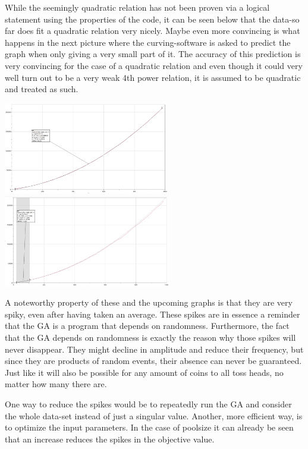 \par
While the seemingly quadratic relation has not been proven via a logical statement using the properties of the code, it can be seen below that the data-so far does fit a quadratic relation very nicely. Maybe even more convincing is what happens in the next picture where the curving-software is asked to predict the graph when only giving a very small part of it. The accuracy of this prediction is very convincing for the case of a quadratic relation and even though it could very well turn out to be a very weak 4th power relation, it is assumed to be quadratic and treated as such.
\vspace{5mm}
\begin{centering}
	\includegraphics[height=4cm]{LPPC}\includegraphics[height=4cm]{LPPP}
\end{centering}
\par
A noteworthy property of these and the upcoming graphs is that they are very spiky, even after having taken an average. These spikes are in essence a reminder that the GA is a program that depends on randomness. Furthermore, the fact that the GA depends on randomness is exactly the reason why those spikes will never disappear. They might decline in amplitude and reduce their frequency, but since they are products of random events, their absence can never be guaranteed. Just like it will also be possible for any amount of coins to all toss heads, no matter how many there are.
\par
One way to reduce the spikes would be to repeatedly run the GA and consider the whole data-set instead of just a singular value. Another, more efficient way, is to optimize the input parameters. In the case of poolsize it can already be seen that an increase reduces the spikes in the objective value.

